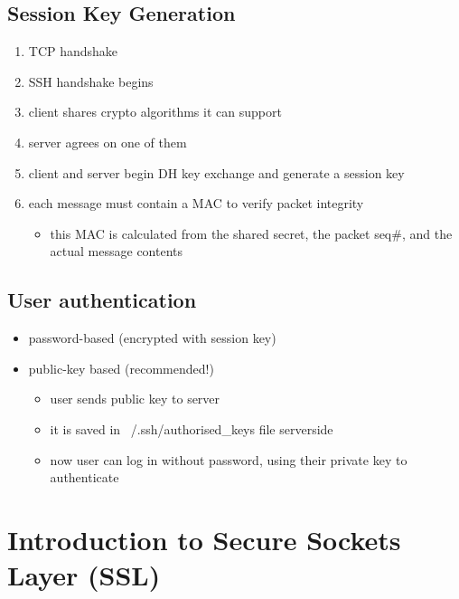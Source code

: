 \documentclass{article}
\begin{document}
\subsection{Session Key Generation}
\begin{enumerate}
    \item TCP handshake
    \item SSH handshake begins
    \item client shares crypto algorithms it can support
    \item server agrees on one of them
    \item client and server begin DH key exchange and generate a session key
    \item each message must contain a MAC to verify packet integrity
    \begin{itemize}
        \item this MAC is calculated from the shared secret, the packet seq\#, and the actual message contents
    \end{itemize}
\end{enumerate}
\subsection{User authentication}
\begin{itemize}
    \item password-based (encrypted with session key)
    \item public-key based (recommended!)
    \begin{itemize}
        \item user sends public key to server
        \item it is saved in ~/.ssh/authorised\_keys file serverside
        \item now user can log in without password, using their private key to authenticate
    \end{itemize}
\end{itemize}
\section{Introduction to Secure Sockets Layer (SSL)}
\end{document}
